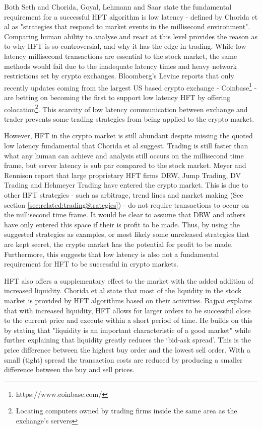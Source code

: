 Both Seth \cite{WEB:SETH:0001} and Chorida, Goyal, Lehmann and Saar \cite{REPORT:ChordiaEtAl:2013} state the fundamental requirement for a successful HFT algorithm is low latency - defined by Chorida et al as "strategies that respond to market events in the millisecond environment". Comparing human ability to analyse and react at this level provides the reason as to why HFT is so controversial, and why it has the edge in trading. While low latency millisecond transactions are essential to the stock market, the same methods would fail due to the inadequate latency times and heavy network restrictions set by crypto exchanges. Bloomberg's Levine reports \cite{WEB:Levine:2018} that only recently updates coming from the largest US based crypto exchange - Coinbase\footnote{https://www.coinbase.com/} - are betting on becoming the first to support low latency HFT by offering colocation\footnote{Locating computers owned by trading firms inside the same area as the exchange's servers}. This scarcity of low latency communication between exchange and trader prevents some trading strategies from being applied to the crypto market. 

However, HFT in the crypto market is still abundant despite missing the quoted low latency fundamental that Chorida et al suggest. Trading is still faster than what any human can achieve and analysis still occurs on the millisecond time frame, but server latency is sub par compared to the stock market. Meyer and Rennison \cite{ART:Meyer:2017} report that large proprietary HFT firms DRW, Jump Trading, DV Trading and Hehmeyer Trading have entered the crypto market. This is due to other HFT strategies - such as arbitrage, trend lines and market making (See section \ref{sec:related:tradingStrategies}) - do not require  transactions to occur on the millisecond time frame. It would be clear to assume that DRW and others have only entered this space if their is profit to be made. Thus, by using the suggested strategies as examples, or most likely some unreleased strategies that are kept secret, the crypto market has the potential for profit to be made. Furthermore, this suggests that low latency is also not a fundamental requirement for HFT to be successful in crypto markets.

HFT also offers a supplementary effect to the market with the added addition of increased liquidity. Chorida et al \cite{REPORT:ChordiaEtAl:2013} state that most of the liquidity in the stock market is provided by HFT algorithms based on their activities. Bajpai \cite{WEB:Bajpai:0001} explains that with increased liquidity, HFT allows for larger orders to be successful close to the current price and execute within a short period of time. He builds on this by stating that "liquidity is an important characteristic of a good market" while further explaining that liquidity greatly reduces the `bid-ask spread'. This is the price difference between the highest buy order and the lowest sell order. With a small (tight) spread the transaction costs are reduced by producing a smaller difference between the buy and sell prices. 

